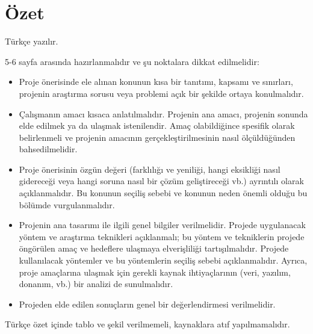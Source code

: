 \chapter{Özet}

Türkçe yazılır. 

5-6 sayfa arasında hazırlanmalıdır ve şu noktalara dikkat edilmelidir:

\begin{itemize}
\item Proje önerisinde ele alınan konunun kısa bir tanıtımı, kapsamı ve sınırları, projenin araştırma sorusu veya problemi açık bir şekilde ortaya konulmalıdır.
\item Çalışmanın amacı kısaca anlatılmalıdır. Projenin ana amacı, projenin sonunda elde edilmek ya da ulaşmak istenilendir. Amaç olabildiğince spesifik olarak belirlenmeli ve projenin amacının gerçekleştirilmesinin nasıl ölçüldüğünden bahsedilmelidir.
\item Proje önerisinin özgün değeri (farklılığı ve yeniliği, hangi eksikliği nasıl gidereceği veya hangi soruna nasıl bir çözüm geliştireceği vb.) ayrıntılı olarak açıklanmalıdır. Bu konunun seçiliş sebebi ve konunun neden önemli olduğu bu bölümde vurgulanmalıdır.
\item Projenin ana tasarımı ile ilgili genel bilgiler verilmelidir. Projede uygulanacak yöntem ve araştırma teknikleri açıklanmalı; bu yöntem ve tekniklerin projede öngörülen amaç ve hedeflere ulaşmaya elverişliliği tartışılmalıdır. Projede kullanılacak yöntemler ve bu yöntemlerin seçiliş sebebi açıklanmalıdır. Ayrıca, proje amaçlarına ulaşmak için gerekli kaynak ihtiyaçlarının (veri, yazılım, donanım, vb.) bir analizi de sunulmalıdır.
\item Projeden elde edilen sonuçların genel bir değerlendirmesi verilmelidir. 
\end{itemize}

Türkçe özet içinde tablo ve şekil verilmemeli, kaynaklara atıf yapılmamalıdır.
